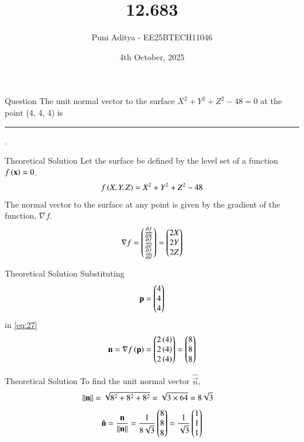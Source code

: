 \documentclass{beamer}
\title{12.683}
\date{4th October, 2025}
\author{Puni Aditya - EE25BTECH11046}
\begin{document}
\frame{\titlepage}
\begin{frame}{Question}
The unit normal vector to the surface $X^2 + Y^2 + Z^2 - 48 = 0$ at the point (4, 4, 4) is \rule{2cm}{0.4pt}.
\end{frame}

\begin{frame}{Theoretical Solution}
Let the surface be defined by the level set of a function $f\left(\mathbf{x}\right) = 0$.
\begin{align}
    f\left(X, Y, Z\right) = X^2 + Y^2 + Z^2 - 48
\end{align}
The normal vector to the surface at any point is given by the gradient of the function, $\nabla f$.
\begin{align}
    \nabla f = \begin{pmatrix}\frac{\partial f}{\partial X} \\ \frac{\partial f}{\partial Y} \\ \frac{\partial f}{\partial Z}\end{pmatrix} = \begin{pmatrix}2X \\ 2Y \\ 2Z\end{pmatrix} \label{eq:27}
\end{align}
\end{frame}

\begin{frame}{Theoretical Solution}
Substituting 
\begin{align}
    \mathbf{p} = \begin{pmatrix}4 \\ 4 \\ 4\end{pmatrix}
\end{align}
in \eqref{eq:27}
\begin{align}
    \mathbf{n} = \nabla f\left(\mathbf{p}\right) = \begin{pmatrix}2\left(4\right) \\ 2\left(4\right) \\ 2\left(4\right)\end{pmatrix} = \begin{pmatrix}8 \\ 8 \\ 8\end{pmatrix}
\end{align}
\end{frame}

\begin{frame}{Theoretical Solution}
To find the unit normal vector $\hat{\vec{n}}$,
\begin{align}
    \left\lVert\mathbf{n}\right\rVert &= \sqrt{8^2 + 8^2 + 8^2} = \sqrt{3 \times 64} = 8\sqrt{3}
\end{align}
\begin{align}
    \hat{\mathbf{n}} = \frac{\mathbf{n}}{\left\lVert\mathbf{n}\right\rVert} = \frac{1}{8\sqrt{3}}\begin{pmatrix}8 \\ 8 \\ 8\end{pmatrix} = \frac{1}{\sqrt{3}}\begin{pmatrix}1 \\ 1 \\ 1\end{pmatrix}
\end{align}
\end{frame}
\end{document}
